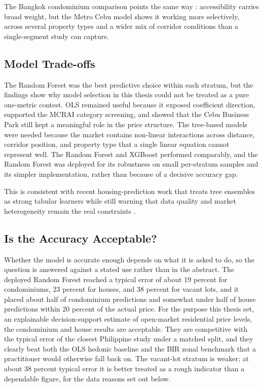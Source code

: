 The Bangkok condominium comparison points the same way \parencite{tochaiwat2023thai}: accessibility carries broad weight, but the Metro Cebu model shows it working more selectively, across several property types and a wider mix of corridor conditions than a single-segment study can capture.

\subsection{Model Trade-offs}\label{model-trade-offs}

The Random Forest was the best predictive choice within each stratum, but the findings show why model selection in this thesis could not be treated as a pure one-metric contest. OLS remained useful because it exposed coefficient direction, supported the MCRAI category screening, and showed that the Cebu Business Park still kept a meaningful role in the price structure. The tree-based models were needed because the market contains non-linear interactions across distance, corridor position, and property type that a single linear equation cannot represent well. The Random Forest and XGBoost performed comparably, and the Random Forest was deployed for its robustness on small per-stratum samples and its simpler implementation, rather than because of a decisive accuracy gap.

This is consistent with recent housing-prediction work that treats tree ensembles as strong tabular learners while still warning that data quality and market heterogeneity remain the real constraints \parencite{nyanda2024,sousa2024}.

\subsection{Is the Accuracy Acceptable?}\label{is-the-accuracy-acceptable}

Whether the model is accurate enough depends on what it is asked to do, so the question is answered against a stated use rather than in the abstract. The deployed Random Forest reached a typical error of about 19 percent for condominiums, 23 percent for houses, and 38 percent for vacant lots, and it placed about half of condominium predictions and somewhat under half of house predictions within 20 percent of the actual price. For the purpose this thesis set, an explainable decision-support estimate of open-market residential price levels, the condominium and house results are acceptable. They are competitive with the typical error of the closest Philippine study under a matched split, and they clearly beat both the OLS hedonic baseline and the BIR zonal benchmark that a practitioner would otherwise fall back on. The vacant-lot stratum is weaker; at about 38 percent typical error it is better treated as a rough indicator than a dependable figure, for the data reasons set out below.

